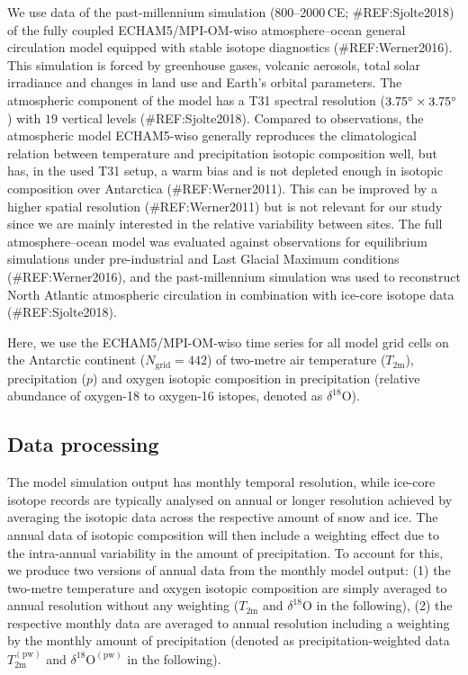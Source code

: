 \documentclass[cp, manuscript]{copernicus}
\begin{document}
We use data of the past-millennium simulation (800--2000\,CE; \#REF:Sjolte2018)
of the fully coupled ECHAM5/MPI-OM-wiso atmosphere--ocean general circulation
model equipped with stable isotope diagnostics (\#REF:Werner2016). This
simulation is forced by greenhouse gases, volcanic aerosols, total solar
irradiance and changes in land use and Earth's orbital parameters. The
atmospheric component of the model has a T31 spectral resolution
($3.75^{\circ}\times3.75^{\circ}$) with $19$ vertical levels
(\#REF:Sjolte2018). Compared to observations, the atmospheric model ECHAM5-wiso
generally reproduces the climatological relation between temperature and
precipitation isotopic composition well, but has, in the used T31 setup, a warm
bias and is not depleted enough in isotopic composition over Antarctica
(\#REF:Werner2011). This can be improved by a higher spatial resolution
(\#REF:Werner2011) but is not relevant for our study since we are mainly
interested in the relative variability between sites. The full atmosphere--ocean
model was evaluated against observations for equilibrium simulations under
pre-industrial and Last Glacial Maximum conditions (\#REF:Werner2016), and the
past-millennium simulation was used to reconstruct North Atlantic atmospheric
circulation in combination with ice-core isotope data (\#REF:Sjolte2018).

Here, we use the ECHAM5/MPI-OM-wiso time series for all model grid cells
on the Antarctic continent ($N_{\mathrm{grid}}=442$) of two-metre air
temperature ($T_{2\mathrm{m}}$), precipitation ($p$) and oxygen isotopic
composition in precipitation (relative abundance of oxygen-18 to oxygen-16
istopes, denoted as $\delta^{18}\mathrm{O}$).

\subsection{Data processing}\label{methods:prc}

The model simulation output has monthly temporal resolution, while ice-core
isotope records are typically analysed on annual or longer resolution achieved
by averaging the isotopic data across the respective amount of snow and
ice. The annual data of isotopic composition will then include a weighting
effect due to the intra-annual variability in the amount of precipitation. To
account for this, we produce two versions of annual data from the monthly model
output: (1) the two-metre temperature and oxygen isotopic composition are simply
averaged to annual resolution without any weighting ($T_{2\mathrm{m}}$ and
$\delta^{18}\mathrm{O}$ in the following), (2) the respective monthly data are
averaged to annual resolution including a weighting by the monthly amount of
precipitation (denoted as precipitation-weighted data
$T_{2\mathrm{m}}^{\mathrm{(pw)}}$ and $\delta^{18}\mathrm{O}^{\mathrm{(pw)}}$ in
the following).
\end{document}
